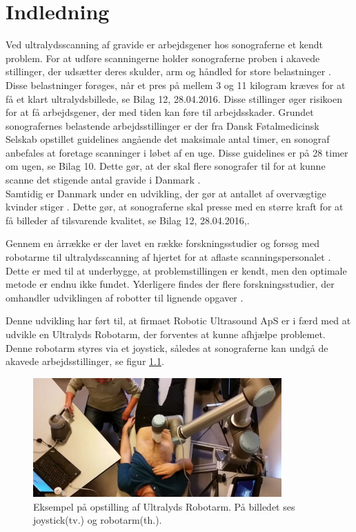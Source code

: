 \chapter{Indledning} 
Ved ultralydsscanning af gravide er arbejdsgener hos sonograferne et kendt problem. For at udføre scanningerne holder sonograferne proben i akavede stillinger, der udsætter deres skulder, arm og håndled for store belastninger \cite{1}\cite{24}\cite{31}\cite{32}\cite{36}. Disse belastninger forøges, når et pres på mellem 3 og 11 kilogram kræves for at få et klart ultralydsbillede, se Bilag 12, 28.04.2016. Disse stillinger øger risikoen for at få arbejdsgener, der med tiden kan føre til arbejdsskader. Grundet sonografernes belastende arbejdsstillinger er der fra Dansk Føtalmedicinsk Selskab opstillet guidelines angående det maksimale antal timer, en sonograf anbefales at foretage scanninger i løbet af en uge. Disse guidelines er på 28 timer om ugen, se Bilag 10. Dette gør, at der skal flere sonografer til for at kunne scanne det stigende antal gravide i Danmark \cite{Foedsler}. \\
Samtidig er Danmark under en udvikling, der gør at antallet af overvægtige kvinder stiger \cite{Overvaegt}. Dette gør, at sonograferne skal presse med en større kraft for at få billeder af tilsvarende kvalitet, se Bilag 12, 28.04.2016,\cite{8}\cite{24}\cite{31}. 

Gennem en årrække er der lavet en række forskningsstudier og forsøg med robotarme til ultralydsscanning af hjertet for at aflaste scanningspersonalet \cite{5}. Dette er med til at underbygge, at problemstillingen er kendt, men den optimale metode er endnu ikke fundet. Yderligere findes der flere forskningsstudier, der omhandler udviklingen af robotter til lignende opgaver \cite{5}\cite{8}\cite{18}. 

Denne udvikling har ført til, at firmaet Robotic Ultrasound ApS er i færd med at udvikle en Ultralyds Robotarm, der forventes at kunne afhjælpe problemet. Denne robotarm styres via et joystick, således at sonograferne kan undgå de akavede arbejdsstillinger, se figur \ref{opstilling}.  

\begin{figure}[H]\centering
	\includegraphics[width = 0.85\textwidth]{Figurer/ergonomiskLosning.jpg}
	\caption{Eksempel på opstilling af Ultralyds Robotarm. På billedet ses joystick(tv.) og robotarm(th.).  }
	\label{opstilling}
\end{figure}

